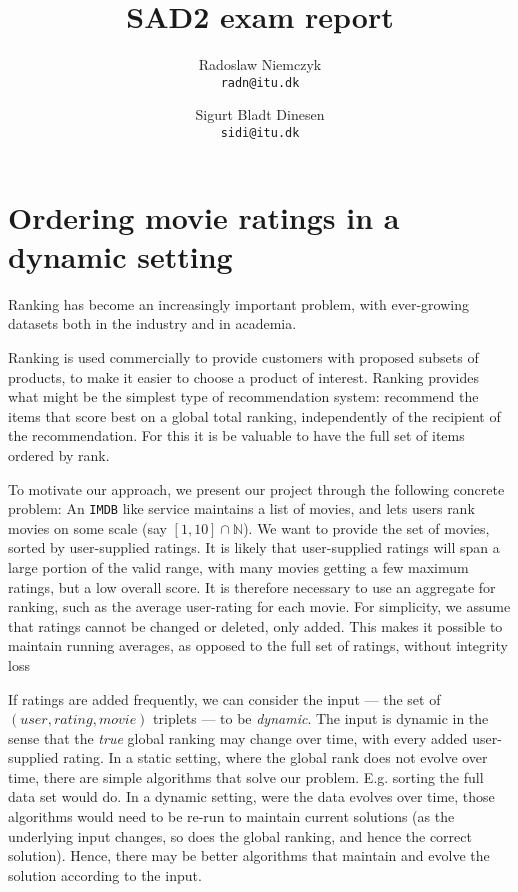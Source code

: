 \documentclass[a4paper, titlepage]{report}
\renewcommand{\%}{\scalebox{.9}{\oldpct}}
\begin{document}
\title{SAD2 exam report}
\author{
	Radoslaw Niemczyk
	\\\texttt{radn@itu.dk}
	\and
	Sigurt Bladt Dinesen
	\\\texttt{sidi@itu.dk}
}

\maketitle


\section*{Ordering movie ratings in a dynamic setting}
Ranking has become an increasingly important problem, with ever-growing datasets
both in the industry and in academia.

Ranking is used commercially to provide customers with proposed subsets of
products, to make it easier to choose a product of interest.
Ranking provides what might be the simplest type of recommendation system:
recommend the items that score best on a global total ranking, independently of
the recipient of the recommendation.
For this it is be valuable to have the full set of items ordered by
rank.

To motivate our approach, we present our project through the following concrete
problem: An \texttt{IMDB} like service maintains a list of movies, and lets
users rank movies on some scale (say $\left[1,10\right]\cap \mathbb{N}$). We
want to provide the set of movies, sorted by user-supplied ratings. It is likely
that  user-supplied ratings will span a large portion of the valid range, with
many movies getting a few maximum ratings, but a low overall score. It is
therefore necessary to use an aggregate for ranking, such as the average
user-rating for each movie. For simplicity, we assume that ratings cannot be
changed or deleted, only added. This makes it possible to maintain running
averages, as
opposed to the full set of ratings, without integrity loss

If ratings are added frequently, we can consider the input --- the set of
$(user, rating, movie)$ triplets --- to be \textit{dynamic}. The input is dynamic
in the sense that the \textit{true} global ranking may change over time, with
every added user-supplied rating. 
In a static setting, where the global rank does not evolve over time, there are
simple algorithms that solve our problem. E.g. sorting the full data set would
do.
In a dynamic setting, were the data evolves over time,
those algorithms would need to be re-run to maintain current solutions (as the
underlying input changes, so does the global ranking, and hence the correct
solution). Hence, there may be better algorithms that maintain and evolve the
solution according to the input.
\end{document}
